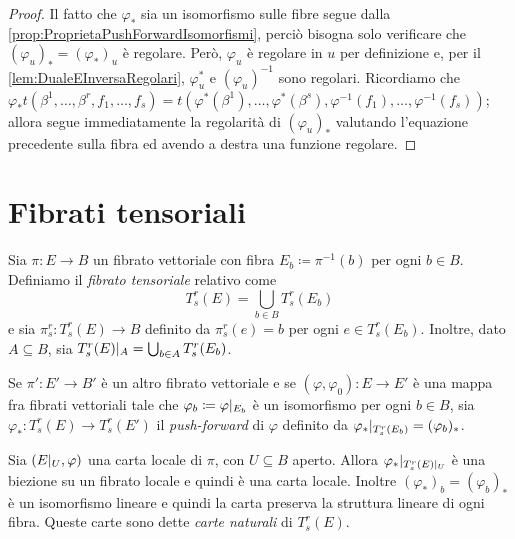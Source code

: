 \begin{proof}
	Il fatto che $\varphi_*$ sia un isomorfismo sulle fibre segue dalla \cref{prop:ProprietaPushForwardIsomorfismi}, perciò bisogna solo verificare che $(\varphi_u)_*=(\varphi_*)_u$ è regolare. Però, $\varphi_u$ è regolare in $u$ per definizione e, per il \cref{lem:DualeEInversaRegolari}, $\varphi_u^*$ e $(\varphi_u)^{-1}$ sono regolari.
	Ricordiamo che $\varphi_*t(\beta^1,\ldots,\beta^r,f_1,\ldots,f_s) = t(\varphi^*(\beta^1),\ldots,\varphi^*(\beta^s),\varphi^{-1}(f_1),\ldots,\varphi^{-1}(f_s))$; allora
	segue immediatamente la regolarità di $(\varphi_u)_*$ valutando l'equazione precedente sulla fibra ed avendo a destra una funzione regolare.
\end{proof}


\section{Fibrati tensoriali}

\begin{definition} 
	Sia $\pi:E\to B$ un fibrato vettoriale con fibra $E_b \coloneqq \pi^{-1}(b)$ per ogni $b\in B$. Definiamo il \emph{fibrato tensoriale} relativo come
	\begin{equation*}
		T_s^r(E) = \bigcup_{b\in B} T_s^r(E_b)
	\end{equation*}
	e sia $\pi_s^r:T_s^r(E)\to B$ definito da $\pi_s^r(e) = b$ per ogni $e\in T_s^r(E_b)$.
	Inoltre, dato $A\subseteq B$, sia $T_s^r(E)|_ A = \bigcup_{b\in A} T_s^r(E_b)$.
\end{definition}

\begin{definition} 
	Se $\pi':E'\to B'$ è un altro fibrato vettoriale e se $(\varphi,\varphi_0):E\to E'$ è una mappa fra fibrati vettoriali tale che $\varphi_b \coloneqq \varphi|_{E_b}$ è un isomorfismo per ogni $b\in B$, sia $\varphi_*:T_s^r(E)\to T_s^r(E')$ il \emph{push-forward} di $\varphi$ definito da $\varphi_*|_{T_s^r(E_b)} = (\varphi_b)_*$.
\end{definition}

Sia $(E|_ U,\varphi)$ una carta locale di $\pi$, con $U\subseteq B$ aperto. Allora $\varphi_* |_{T_s^r(E)|_ U}$ è una biezione su un fibrato locale e quindi è una carta locale.
Inoltre $(\varphi_*)_b = (\varphi_b)_*$ è un isomorfismo lineare e quindi la carta preserva la struttura lineare di ogni fibra. Queste carte sono dette \emph{carte naturali} di $T_s^r(E)$.

